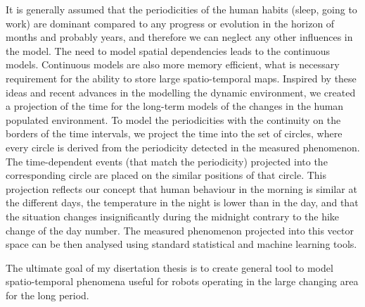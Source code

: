 It is generally assumed that the periodicities of the human habits (sleep, going to work) are dominant compared to any progress or evolution in the horizon of months and probably years, and therefore we can neglect any other influences in the model.
The need to model spatial dependencies leads to the continuous models.
Continuous models are also more memory efficient, what is necessary requirement for the ability to store large spatio-temporal maps. 
Inspired by these ideas and recent advances in the modelling the dynamic environment, we created a projection of the time for the long-term models of the changes in the human populated environment.
To model the periodicities with the continuity on the borders of the time intervals, we project the time into the set of circles, where every circle is derived from the periodicity detected in the measured phenomenon.
The time-dependent events (that match the periodicity) projected into the corresponding circle are placed on the similar positions of that circle.
This projection reflects our concept that human behaviour in the morning is similar at the different days, the temperature in the night is lower than in the day, and that the situation changes insignificantly during the midnight contrary to the hike change of the day number.
The measured phenomenon projected into this vector space can be then analysed using standard statistical and machine learning tools.

The ultimate goal of my disertation thesis is to create general tool to model spatio-temporal phenomena useful for robots operating in the large changing area for the long period.
